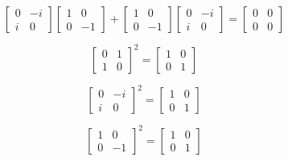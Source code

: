 \documentclass[english]{article}
\begin{document}
\begin{multicols*}{2}
\[
\begin{bmatrix}
0&-i\\
i&0
\end{bmatrix}
\begin{bmatrix}
1&0\\
0&-1
\end{bmatrix}
+
\begin{bmatrix}
1&0\\
0&-1
\end{bmatrix}
\begin{bmatrix}
0&-i\\
i&0
\end{bmatrix}
=
\begin{bmatrix}
0&0\\
0&0
\end{bmatrix}
\]

\[
\begin{bmatrix}
0&1\\
1&0
\end{bmatrix}^2
=
\begin{bmatrix}
1&0\\
0&1
\end{bmatrix}
\]

\[
\begin{bmatrix}
0&-i\\
i&0
\end{bmatrix}^2
=
\begin{bmatrix}
1&0\\
0&1
\end{bmatrix}
\]

\[
\begin{bmatrix}
1&0\\
0&-1 
\end{bmatrix}^2
=
\begin{bmatrix}
1&0\\
0&1
\end{bmatrix}
\]


\end{multicols*}
\end{document}

